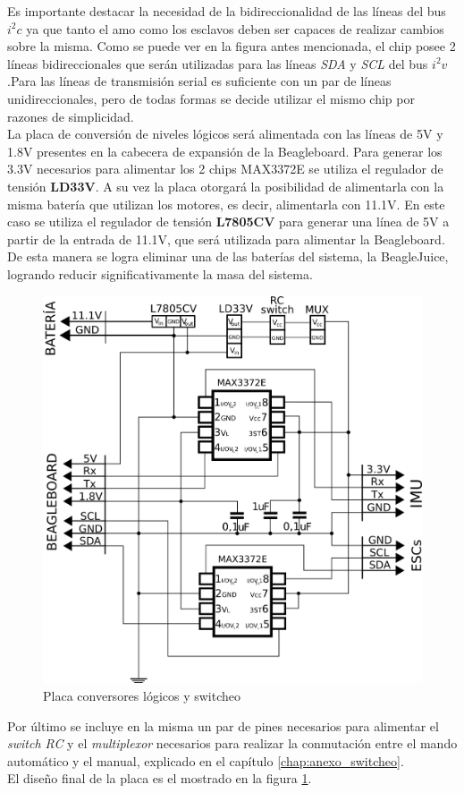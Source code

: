 \documentclass[main]{subfiles}
\begin{document}
Es importante destacar la necesidad de la bidireccionalidad de las líneas del bus $i^2c$ ya que tanto el amo como los esclavos deben ser capaces de realizar cambios sobre la misma. Como se puede ver en la figura antes mencionada, el chip posee 2 líneas bidireccionales que serán utilizadas para las líneas \emph{SDA} y \emph{SCL} del bus $i^2v$.Para las líneas de transmisión serial es suficiente con un par de líneas unidireccionales, pero de todas formas se decide utilizar el mismo chip por razones de simplicidad.\\

La placa de conversión de niveles lógicos será alimentada con las líneas de 5V y 1.8V presentes en la cabecera de expansión de la Beagleboard. Para generar los 3.3V necesarios para alimentar los 2 chips MAX3372E se utiliza el regulador de tensión \textbf{LD33V}. A su vez la placa otorgará la posibilidad de alimentarla con la misma batería que utilizan los motores, es decir, alimentarla con 11.1V. En este caso se utiliza el regulador de tensión \textbf{L7805CV} para generar una línea de 5V a partir de la entrada de 11.1V, que será utilizada para alimentar la Beagleboard. De esta manera se logra eliminar una de las baterías del sistema, la BeagleJuice, logrando reducir significativamente la masa del sistema.\\

\begin{figure}[h!]
	\centering
	\vspace{-12pt}
	\includegraphics[width=.75\textwidth]{./pics_electronica/esquema_plaquita.png}
	\caption{Placa conversores lógicos y switcheo}
	\label{fig:plaquita}
\end{figure}

Por último se incluye en la misma un par de pines necesarios para alimentar el \emph{switch RC} y el \emph{multiplexor} necesarios para realizar la conmutación entre el mando automático y el manual, explicado en el capítulo \ref{chap:anexo_switcheo}.\\

El diseño final de la placa es el mostrado en la figura \ref{fig:plaquita}.
\end{document}
